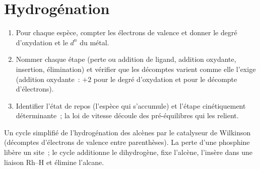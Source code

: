 \section{Hydrogénation}

\begin{method}\label{met:b3:homogeneous-catalysis:read-cycle}
\begin{enumerate}
  \item Pour chaque espèce, compter les électrons de valence et donner le
        degré d'oxydation et le $d^n$ du métal.
  \item Nommer chaque étape (perte ou addition de ligand, addition
        oxydante, insertion, élimination) et vérifier que les décomptes
        varient comme elle l'exige (addition oxydante~: $+2$ pour le degré
        d'oxydation et pour le décompte d'électrons).
  \item Identifier l'état de repos (l'espèce qui s'accumule) et l'étape
        cinétiquement déterminante~; la loi de vitesse découle des
        pré-équilibres qui les relient.
\end{enumerate}
\end{method}

\begin{omfigure}

{\small Un cycle simplifié de l'hydrogénation des alcènes par le catalyseur
de Wilkinson (décomptes d'électrons de valence entre parenthèses). La perte
d'une phosphine libère un site~; le cycle additionne le dihydrogène, fixe
l'alcène, l'insère dans une liaison Rh--H et élimine l'alcane.}
\end{omfigure}

